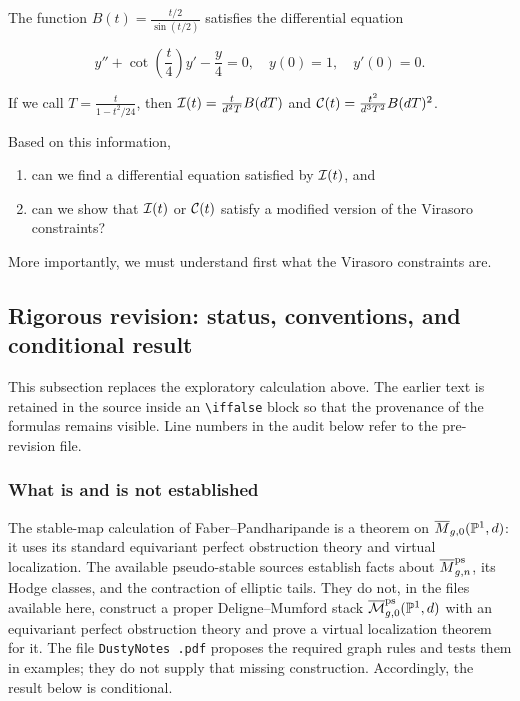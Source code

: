 \documentclass[12pt]{memoir}
\begin{document}
The function \(B(t)=\frac{t/2}{\sin(t/2)}\) satisfies the differential equation 

\[
y''+\cot\left(\frac{t}{4}\right)y'-\frac{y}{4}=0,\quad y(0)=1,\quad y'(0)=0.
\]

If we call \(T=\frac{t}{1-t^2/24}\), then \(\mathcal{I}(t)=\frac{t}{d^2T}B(dT)\) and \(\mathcal{C}(t)=\frac{t^2}{d^3T^2}B(dT)^2\).

\begin{Qn}
    Based on this information,
    \begin{enumerate}
        \item can we find a differential equation satisfied by \(\mathcal{I}(t)\), and
        \item can we show that \(\mathcal{I}(t)\) or \(\mathcal{C}(t)\) satisfy a modified version of the Virasoro constraints?
    \end{enumerate}
    More importantly, we must understand first what the Virasoro constraints are.
\end{Qn}
\fi

\subsection{Rigorous revision: status, conventions, and conditional result}

This subsection replaces the exploratory calculation above.  The earlier text is
retained in the source inside an \verb|\iffalse| block so that the provenance of
the formulas remains visible.  Line numbers in the audit below refer to the
pre-revision file.

\subsubsection{What is and is not established}

The stable-map calculation of Faber--Pandharipande is a theorem on
\(\overline{M}_{g,0}(\mathbb{P}^1,d)\): it uses its standard equivariant perfect obstruction
theory and virtual localization.  The available pseudo-stable sources establish
facts about \(\overline{M}^{\operatorname{\mathrm{ps}}}_{g,n}\), its Hodge classes, and the contraction of
elliptic tails.  They do not, in the files available here, construct a proper
Deligne--Mumford stack \(\overline{\mathcal{M}}^{\operatorname{\mathrm{ps}}}_{g,0}(\mathbb{P}^1,d)\) with an equivariant
perfect obstruction theory and prove a virtual localization theorem for it.
The file \texttt{DustyNotes .pdf} proposes the required graph rules and tests them in
examples; they do not supply that missing construction.  Accordingly, the
result below is conditional.
\end{document}
